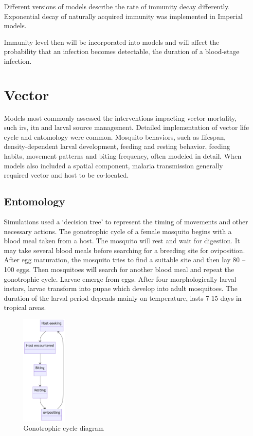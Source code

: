 \documentclass[a4paper, 12pt, twoside]{article}
\begin{document}
Different versions of models describe the rate of immunity decay differently.
Exponential decay of naturally acquired immunity was implemented in Imperial models.


Immunity level then will be incorporated into models and will affect the probability that an infection becomes detectable, the duration of a blood-stage infection.

\section{Vector}%
\label{sec:vector}
Models most commonly assessed the interventions impacting vector mortality, such \gls{irs}, \gls{itn} and larval source management.
Detailed implementation of vector life cycle and entomology were common.
Mosquito behaviors, such as lifespan, density-dependent larval development, feeding and resting behavior, feeding habits, movement patterns and biting frequency, often modeled in detail.
When models also included a spatial component, malaria transmission generally required vector and host to be co-located.

\subsection{Entomology}
Simulations used a ‘decision tree’ to represent the timing of movements and other necessary actions.
The gonotrophic cycle of a female mosquito begins with a blood meal taken from a host.
The mosquito will rest and wait for digestion.
It may take several blood meals before searching for a breeding site for oviposition.
After egg maturation, the mosquito tries to find a suitable site and then lay 80 – 100 eggs.
Then mosquitoes will search for another blood meal and repeat the gonotrophic cycle.
Larvae emerge from eggs.
After four morphologically larval instars, larvae transform into pupae which develop into adult mosquitoes.
The duration of the larval period depends mainly on temperature, lasts 7-15 days in tropical areas.

\begin{figure}[htpb]
	\centering
	\includegraphics[width=0.2\textwidth]{gonotrophic-cycle-diagram}
	\caption{Gonotrophic cycle diagram}
	\label{fig:gonotrophic-cycle-diagram}
\end{figure}
\end{document}
